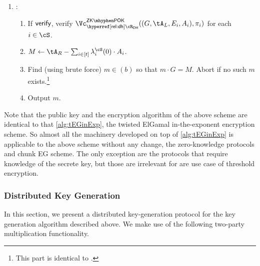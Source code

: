 \begin{algorithm}
\begin{description}
\begin{enumerate}
\begin{enumerate}
				 \item If  $\verifys$, also send $\pi_i \getsr \pZKPOK{\rdh}((G,\tA_L,E_i,A_i),e_i)$ to \Cc. 
			\end{enumerate}
		
		
			
			\item  \Cc: 
			\begin{enumerate}
				
				\item  If  $\verifys$,  verify $\vZKPOK{\rdh}((G,\tA_L,E_i,A_i),\pi_i)$ for each $i\in \cS$.
				
				\item $M \asn \tA_R - \sum_{i\in [t]}   \lambda_i^\cS(0) \cdot A_i$.
				
				\item Find (using brute force) $m\in(b)$ so that $m\cdot G = M$. Abort if no such $m$ exists.\footnote{This part is identical to \EgDec.}
				
				\item Output $m$.
			\end{enumerate}
		\end{enumerate}
		
	\end{description}
	
	
	
	
\end{algorithm}	

Note that the public key and the encryption algorithm of the above scheme are identical to that \cref{alg:tEGinExp}, the twisted ElGamal in-the-exponent encryption scheme. So almost all the machinery  developed on top of \cref{alg:tEGinExp} is applicable to the above scheme without any change, \ie the zero-knowledge protocols and chunk EG scheme. The only exception are the protocols that require knowledge of the secrete key, but those are irrelevant for are use case of   threshold encryption.

\subsubsection{Distributed Key Generation}
In this section, we present a distributed key-generation  protocol for the key generation algorithm \tdKg described above.  We make use of the following two-party multiplication   functionality.

